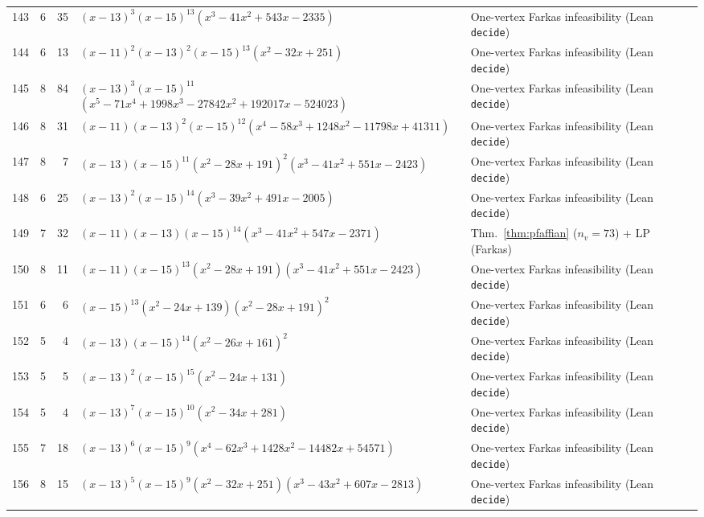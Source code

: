 \documentclass[11pt,reqno]{amsart}
\theoremstyle{definition}
\theoremstyle{remark}
\numberwithin{equation}{section}
\numberwithin{table}{section}
\begin{document}
{\begin{longtable}{@{}rrr>{\raggedright\arraybackslash}p{2.50in}>{\raggedright\arraybackslash}p{2.30in}@{}}
143 & 6 & 35 & $(x-13)^3$\allowbreak $(x-15)^{13}$\allowbreak $(x^3-41x^2+543x-2335)$ & One-vertex Farkas infeasibility (Lean \texttt{decide}) \\
144 & 6 & 13 & $(x-11)^2$\allowbreak $(x-13)^2$\allowbreak $(x-15)^{13}$\allowbreak $(x^2-32x+251)$ & One-vertex Farkas infeasibility (Lean \texttt{decide}) \\
145 & 8 & 84 & $(x-13)^3$\allowbreak $(x-15)^{11}$\allowbreak $(x^5-71x^4+1998x^3-27842x^2+192017x-524023)$ & One-vertex Farkas infeasibility (Lean \texttt{decide}) \\
146 & 8 & 31 & $(x-11)$\allowbreak $(x-13)^2$\allowbreak $(x-15)^{12}$\allowbreak $(x^4-58x^3+1248x^2-11798x+41311)$ & One-vertex Farkas infeasibility (Lean \texttt{decide}) \\
147 & 8 & 7 & $(x-13)$\allowbreak $(x-15)^{11}$\allowbreak $(x^2-28x+191)^2$\allowbreak $(x^3-41x^2+551x-2423)$ & One-vertex Farkas infeasibility (Lean \texttt{decide}) \\
148 & 6 & 25 & $(x-13)^2$\allowbreak $(x-15)^{14}$\allowbreak $(x^3-39x^2+491x-2005)$ & One-vertex Farkas infeasibility (Lean \texttt{decide}) \\
149 & 7 & 32 & $(x-11)$\allowbreak $(x-13)$\allowbreak $(x-15)^{14}$\allowbreak $(x^3-41x^2+547x-2371)$ & Thm.~\ref{thm:pfaffian} ($n_v=73$) + LP (Farkas) \\
150 & 8 & 11 & $(x-11)$\allowbreak $(x-15)^{13}$\allowbreak $(x^2-28x+191)$\allowbreak $(x^3-41x^2+551x-2423)$ & One-vertex Farkas infeasibility (Lean \texttt{decide}) \\
151 & 6 & 6 & $(x-15)^{13}$\allowbreak $(x^2-24x+139)$\allowbreak $(x^2-28x+191)^2$ & One-vertex Farkas infeasibility (Lean \texttt{decide}) \\
152 & 5 & 4 & $(x-13)$\allowbreak $(x-15)^{14}$\allowbreak $(x^2-26x+161)^2$ & One-vertex Farkas infeasibility (Lean \texttt{decide}) \\
153 & 5 & 5 & $(x-13)^2$\allowbreak $(x-15)^{15}$\allowbreak $(x^2-24x+131)$ & One-vertex Farkas infeasibility (Lean \texttt{decide}) \\
154 & 5 & 4 & $(x-13)^7$\allowbreak $(x-15)^{10}$\allowbreak $(x^2-34x+281)$ & One-vertex Farkas infeasibility (Lean \texttt{decide}) \\
155 & 7 & 18 & $(x-13)^6$\allowbreak $(x-15)^9$\allowbreak $(x^4-62x^3+1428x^2-14482x+54571)$ & One-vertex Farkas infeasibility (Lean \texttt{decide}) \\
156 & 8 & 15 & $(x-13)^5$\allowbreak $(x-15)^9$\allowbreak $(x^2-32x+251)$\allowbreak $(x^3-43x^2+607x-2813)$ & One-vertex Farkas infeasibility (Lean \texttt{decide}) \\

\end{longtable}}
\end{document}
